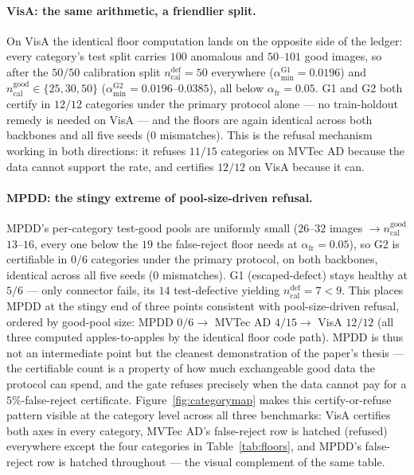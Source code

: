 \documentclass[11pt]{article}
\begin{document}
\paragraph{VisA: the same arithmetic, a friendlier split.} On VisA the identical floor
computation lands on the opposite side of the ledger: every category's test split carries
$100$ anomalous and $50$--$101$ good images, so after the $50/50$ calibration split
$n_{\text{cal}}^{\text{def}} = 50$ everywhere ($\alpha_{\min}^{\text{G1}} = 0.0196$) and
$n_{\text{cal}}^{\text{good}} \in \{25, 30, 50\}$ ($\alpha_{\min}^{\text{G2}} =
0.0196$--$0.0385$), all below $\alpha_{\text{fr}} = 0.05$. G1 and G2 both certify in
$12/12$ categories under the primary protocol alone --- no train-holdout remedy is needed on
VisA --- and the floors are again identical across both backbones and all five seeds ($0$
mismatches). This is the refusal mechanism working in both directions: it refuses $11/15$
categories on MVTec AD because the data cannot support the rate, and certifies $12/12$ on VisA
because it can.

\paragraph{MPDD: the stingy extreme of pool-size-driven refusal.} MPDD's per-category
test-good pools are uniformly small ($26$--$32$ images $\to n_{\text{cal}}^{\text{good}}$
$13$--$16$, every one below the $19$ the false-reject floor needs at $\alpha_{\text{fr}}=0.05$),
so G2 is certifiable in $0/6$ categories under the primary protocol, on both backbones,
identical across all five seeds ($0$ mismatches). G1 (escaped-defect) stays healthy at $5/6$ ---
only connector fails, its $14$ test-defective yielding $n_{\text{cal}}^{\text{def}}=7<9$.
This places MPDD at the stingy end of three points consistent with pool-size-driven refusal, ordered by good-pool size:
MPDD $0/6 \to$ MVTec AD $4/15 \to$ VisA $12/12$ (all three computed apples-to-apples by
the identical floor code path). MPDD is thus not an intermediate point but the cleanest
demonstration of the paper's thesis --- the certifiable count is a property of how much
exchangeable good data the protocol can spend, and the gate refuses precisely when the data
cannot pay for a $5\%$-false-reject certificate.
Figure~\ref{fig:categorymap} makes this certify-or-refuse pattern visible at the category level
across all three benchmarks: VisA certifies both axes in every category, MVTec AD's false-reject
row is hatched (refused) everywhere except the four categories in Table~\ref{tab:floors}, and
MPDD's false-reject row is hatched throughout --- the visual complement of the same table.
\end{document}

